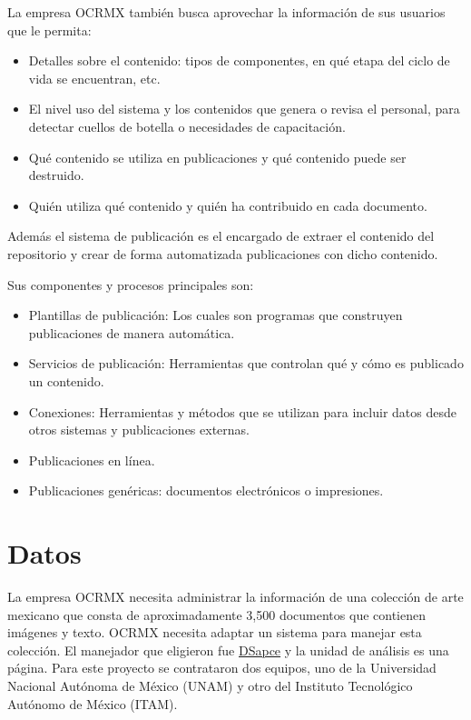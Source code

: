 La empresa OCRMX también busca aprovechar la información de sus usuarios que le permita: 
\begin{itemize}

\item Detalles sobre el contenido: tipos de componentes, en qué etapa del ciclo de vida se encuentran, etc.
\item El nivel uso del sistema y los contenidos que genera o revisa el personal, para detectar cuellos de botella o necesidades de capacitación.
\item Qué contenido  se utiliza en publicaciones y qué contenido puede ser destruido.
\item 	Quién utiliza qué contenido y quién ha contribuido en cada documento.
\end{itemize}

Además el sistema de publicación es el encargado de extraer el contenido del repositorio y crear de forma automatizada publicaciones con dicho contenido.

	Sus componentes y procesos principales son:
	\begin{itemize}
    \item 	Plantillas de publicación: Los cuales son programas que construyen publicaciones de manera automática.
    \item 	Servicios de publicación: Herramientas que controlan qué y cómo es publicado un contenido.
    \item 	Conexiones: Herramientas y métodos que se utilizan para incluir datos desde otros sistemas y publicaciones externas.
    \item 	Publicaciones en línea.
    \item 	Publicaciones genéricas: documentos electrónicos o impresiones.
    \end{itemize}



\section{Datos}
La empresa OCRMX necesita administrar la información de una colección de arte mexicano que  consta de aproximadamente  3,500 documentos que contienen imágenes y  texto. OCRMX necesita  adaptar un sistema para manejar esta colección. El manejador que eligieron fue \href{http://dspace.org}{DSapce} y la unidad de análisis es una página. 
Para este proyecto se contrataron dos equipos, uno de la  Universidad Nacional Autónoma de México (UNAM) y otro del Instituto Tecnológico Autónomo de México (ITAM).

